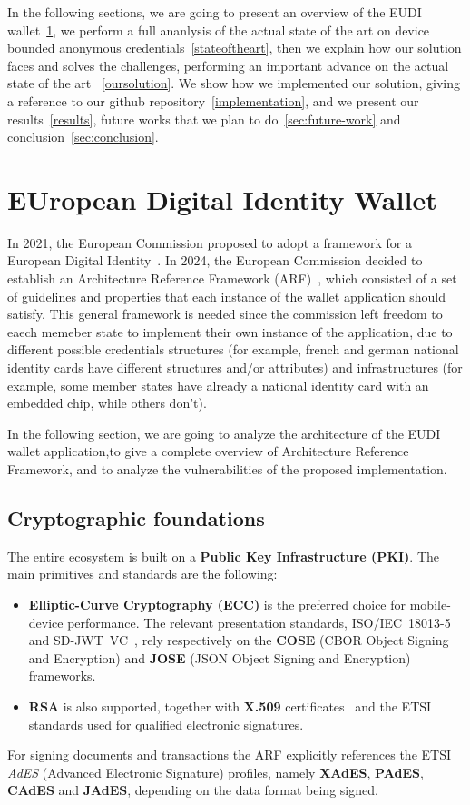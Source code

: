 \documentclass{article}
\begin{document}
In the following sections, we are going to present an overview of the EUDI wallet~\ref{eudiw}, we perform a full ananlysis of the actual state of the art on device bounded anonymous 
credentials~\ref{stateoftheart}, then we explain how our solution faces and solves the challenges, performing an important advance on the actual state of the art ~\ref{oursolution}.
We show how we implemented our solution, giving a reference to our github repository~\ref{implementation}, and we present our results~\ref{results}, future works that we plan to 
do~\ref{sec:future-work} and conclusion~\ref{sec:conclusion}.


\section{EUropean Digital Identity Wallet}
\label{eudiw}
In 2021, the European Commission proposed to adopt a framework for a European Digital Identity~\cite{EuropeanCommission2021EUDI}.
In 2024, the European Commission decided to establish an Architecture Reference Framework (ARF)~\cite{EuropeanCommission2024EUDIARF},
which consisted of a set of guidelines and properties that each instance of the wallet application should satisfy.
This general framework is needed since the commission left freedom to eaech memeber state to implement their own 
instance of the application, due to different possible credentials structures (for example, french and german national 
identity cards have different structures and/or attributes) and infrastructures (for example, some member states have 
already a national identity card with an embedded chip, while others don't).

In the following section, we are going to analyze the architecture of the EUDI wallet application,to give a complete 
overview of Architecture Reference Framework, and to analyze the vulnerabilities of the proposed implementation.

\subsection{Cryptographic foundations}
\label{eudi:crypto}
The entire ecosystem is built on a \textbf{Public Key Infrastructure (PKI)}. The main primitives and standards are the
following:
\begin{itemize}[noitemsep]
  \item \textbf{Elliptic-Curve Cryptography (ECC)} is the preferred choice for mobile-device performance. The relevant
        presentation standards, ISO/IEC~18013-5~\cite{iso18013-5} and SD-JWT~VC~\cite{sdjwtvc}, rely respectively on the
        \textbf{COSE} (CBOR Object Signing and Encryption) and \textbf{JOSE} (JSON Object Signing and Encryption)
        frameworks.
  \item \textbf{RSA} is also supported, together with \textbf{X.509} certificates~\cite{rfc5280} and the ETSI standards
        used for qualified electronic signatures.
\end{itemize}
For signing documents and transactions the ARF explicitly references the ETSI \emph{AdES} (Advanced Electronic
Signature) profiles, namely \textbf{XAdES}, \textbf{PAdES}, \textbf{CAdES} and \textbf{JAdES}, depending on the data
format being signed.
\end{document}
